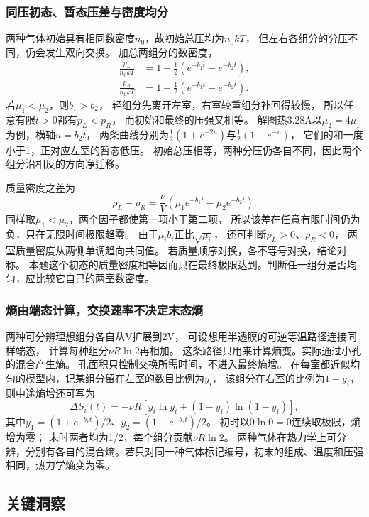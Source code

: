 \documentclass[UTF8,fontset=fandol,a4paper,11pt]{ctexart}
\begin{document}
\subsubsection*{同压初态、暂态压差与密度均分}
两种气体初始具有相同数密度$n_0$，故初始总压均为$n_0kT$，
但左右各组分的分压不同，仍会发生双向交换。
加总两组分的数密度，
\[
\begin{aligned}
\frac{p_L}{n_0kT}&=1+\frac12(e^{-b_1t}-e^{-b_2t}),\\
\frac{p_R}{n_0kT}&=1-\frac12(e^{-b_1t}-e^{-b_2t}).
\end{aligned}
\]
若$\mu_1<\mu_2$，则$b_1>b_2$，
轻组分先离开左室，右室较重组分补回得较慢，
所以任意有限$t>0$都有$p_L<p_R$，
而初始和最终的压强又相等。
解图热3.28A以$\mu_2=4\mu_1$为例，横轴$u=b_2t$，
两条曲线分别为$\tfrac12(1+e^{-2u})$与$\tfrac12(1-e^{-u})$，
它们的和一度小于1，正对应左室的暂态低压。
初始总压相等，两种分压仍各自不同，因此两个组分沿相反的方向净迁移。

质量密度之差为
\[
\rho_L-\rho_R
=\frac\nu V(\mu_1e^{-b_1t}-\mu_2e^{-b_2t}).
\]
同样取$\mu_1<\mu_2$，两个因子都使第一项小于第二项，
所以该差在任意有限时间仍为负，只在无限时间极限趋零。
由于$\mu_i b_i$正比$\sqrt{\mu_i}$，
还可判断$\dot\rho_L>0$、$\dot\rho_R<0$，
两室质量密度从两侧单调趋向共同值。
若质量顺序对换，各不等号对换，结论对称。
本题这个初态的质量密度相等因而只在最终极限达到。判断任一组分是否均匀，应比较它自己的两室数密度。

\subsubsection*{熵由端态计算，交换速率不决定末态熵}
两种可分辨理想组分各自从V扩展到2V，
可设想用半透膜的可逆等温路径连接同样端态，
计算每种组分$\nu R\ln2$再相加。
这条路径只用来计算熵变。实际通过小孔的混合产生熵。
孔面积只控制交换所需时间，不进入最终熵增。
在每室都近似均匀的模型内，记某组分留在左室的数目比例为$y_i$，
该组分在右室的比例为$1-y_i$，则中途熵增还可写为
\[
\Delta S_i(t)=-\nu R[y_i\ln y_i+(1-y_i)\ln(1-y_i)],
\]
其中$y_1=(1+e^{-b_1t})/2$、$y_2=(1-e^{-b_2t})/2$。
初时以$0\ln0=0$连续取极限，熵增为零；
末时两者均为1/2，每个组分贡献$\nu R\ln2$。
两种气体在热力学上可分辨，分别有各自的混合熵。若只对同一种气体标记编号，初末的组成、温度和压强相同，热力学熵变为零。




\subsection*{关键洞察}
\end{document}
